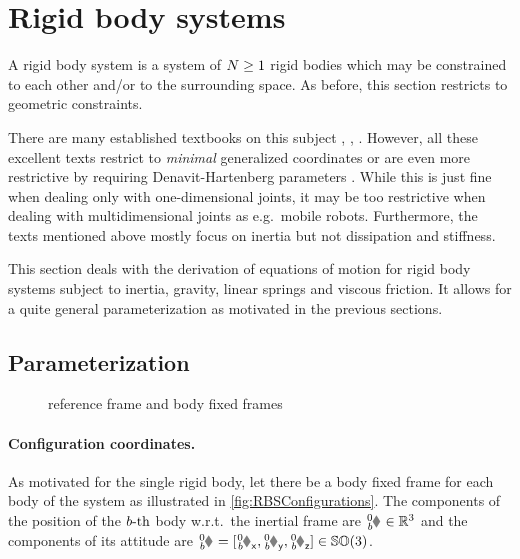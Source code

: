 \section{Rigid body systems}\label{sec:RBSRigidBodySys}
A rigid body system is a system of $N \geq 1$ rigid bodies which may be constrained to each other and/or to the surrounding space.
As before, this section restricts to geometric constraints.

There are many established textbooks on this subject \eg \cite{Schwertassek:MultibodySystems}, \cite{Murray:Robotic}, \cite{Kane:Dynamics}.
However, all these excellent texts restrict to \textit{minimal} generalized coordinates or are even more restrictive by requiring Denavit-Hartenberg parameters \cite{DenavitHartenbergParam}.
While this is just fine when dealing only with one-dimensional joints, it may be too restrictive when dealing with multidimensional joints as e.g.\ mobile robots.
Furthermore, the texts mentioned above mostly focus on inertia but not dissipation and stiffness.

This section deals with the derivation of equations of motion for rigid body systems subject to inertia, gravity, linear springs and viscous friction.
It allows for a quite general parameterization as motivated in the previous sections.

\subsection{Parameterization}\label{sec:RBSParameterization}
\begin{figure}[ht]
 \centering
 
 \caption{reference frame and body fixed frames}
 \label{fig:RBSConfigurations}
\end{figure}

\paragraph{Configuration coordinates.}
As motivated for the single rigid body, let there be a body fixed frame for each body of the system as illustrated in \autoref{fig:RBSConfigurations}.
The components of the position of the $b\text{-th}$ body w.r.t.\ the inertial frame are $\bodyPos{0}{\BidxII} \in \RealNum^3$ and the components of its attitude are $\bodyRot{0}{\BidxII} = [\bodyRotx{0}{\BidxII}, \bodyRoty{0}{\BidxII}, \bodyRotz{0}{\BidxII}] \in \SpecialOrthogonalGroup(3)$.

